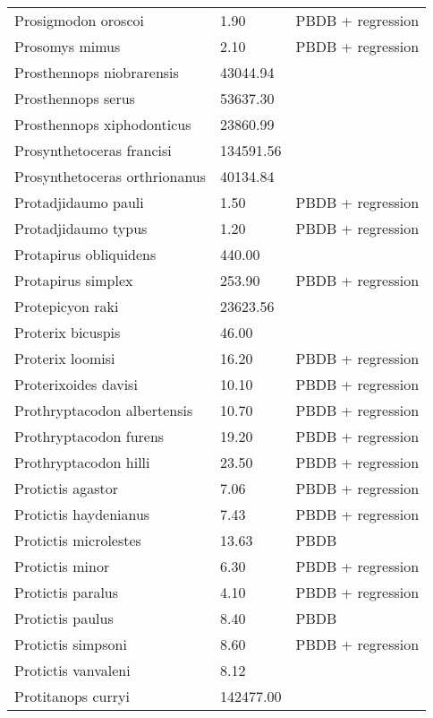 \begin{longtable}{p{} p{} p{}}
    Prosigmodon oroscoi & 1.90 & PBDB + regression \\ 
    Prosomys mimus & 2.10 & PBDB + regression \\ 
    Prosthennops niobrarensis & 43044.94 & \cite{Tomiya2013} \\ 
    Prosthennops serus & 53637.30 & \cite{Tomiya2013} \\ 
    Prosthennops xiphodonticus & 23860.99 & \cite{Tomiya2013} \\ 
    Prosynthetoceras francisi & 134591.56 & \cite{Tomiya2013} \\ 
    Prosynthetoceras orthrionanus & 40134.84 & \cite{Tomiya2013} \\ 
    Protadjidaumo pauli & 1.50 & PBDB + regression \\ 
    Protadjidaumo typus & 1.20 & PBDB + regression \\ 
    Protapirus obliquidens & 440.00 & \cite{Rose1982a} \\ 
    Protapirus simplex & 253.90 & PBDB + regression \\ 
    Protepicyon raki & 23623.56 & \cite{Tomiya2013} \\ 
    Proterix bicuspis & 46.00 & \cite{Coombs1979} \\ 
    Proterix loomisi & 16.20 & PBDB + regression \\ 
    Proterixoides davisi & 10.10 & PBDB + regression \\ 
    Prothryptacodon albertensis & 10.70 & PBDB + regression \\ 
    Prothryptacodon furens & 19.20 & PBDB + regression \\ 
    Prothryptacodon hilli & 23.50 & PBDB + regression \\ 
    Protictis agastor & 7.06 & PBDB + regression \\ 
    Protictis haydenianus & 7.43 & PBDB + regression \\ 
    Protictis microlestes & 13.63 & PBDB \\ 
    Protictis minor & 6.30 & PBDB + regression \\ 
    Protictis paralus & 4.10 & PBDB + regression \\ 
    Protictis paulus & 8.40 & PBDB \\ 
    Protictis simpsoni & 8.60 & PBDB + regression \\ 
    Protictis vanvaleni & 8.12 & \cite{Emry2005} \\ 
    Protitanops curryi & 142477.00 & \cite{McKenna2011} \\ 

\end{longtable}
